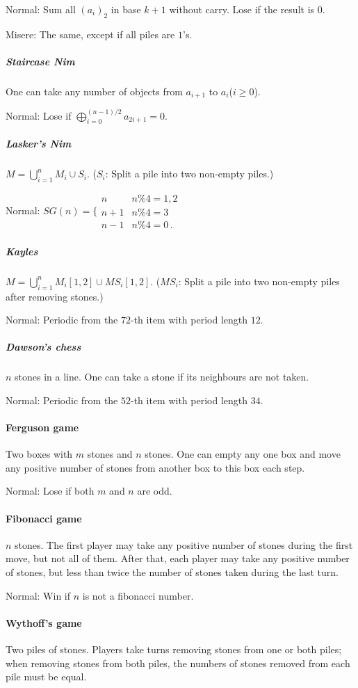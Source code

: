 Normal: Sum all $(a_i)_2$ in base $k+1$ without carry. Lose if the result is $0$.

Misere: The same, except if all piles are $1$'s.

\subparagraph{Staircase Nim}
One can take any number of objects from $a_{i+1}$ to $a_i$($i\ge 0$).

Normal: Lose if $\bigoplus_{i=0}^{(n-1)/2}a_{2i+1}=0$.

\subparagraph{Lasker's Nim}
$M=\bigcup_{i=1}^nM_i\cup S_i$. ($S_i$: Split a pile into two non-empty piles.)

Normal: $SG(n)=\biggl\{\begin{array}{lr}
n & n\%4=1,2\\
n+1 & n\%4=3\\
n-1 & n\%4=0\,.\end{array}$

\subparagraph{Kayles}
$M=\bigcup_{i=1}^nM_i[1,2]\cup MS_i[1,2]$. ($MS_i$: Split a pile into two non-empty piles after removing stones.)

Normal: Periodic from the $72$-th item with period length $12$.

\subparagraph{Dawson's chess}
$n$ stones in a line. One can take a stone if its neighbours are not taken.

Normal: Periodic from the $52$-th item with period length $34$.

\paragraph{Ferguson game}
Two boxes with $m$ stones and $n$ stones. One can empty any one box and move any positive number of stones from another box to this box each step.

Normal: Lose if both $m$ and $n$ are odd.

\paragraph{Fibonacci game}
$n$ stones. The first player may take any positive number of stones during the first move, but not all of them. After that, each player may take any positive number of stones, but less than twice the number of stones taken during the last turn.

Normal: Win if $n$ is not a fibonacci number.

\paragraph{Wythoff's game}
Two piles of stones. Players take turns removing stones from one or both piles; when removing stones from both piles, the numbers of stones removed from each pile must be equal.

